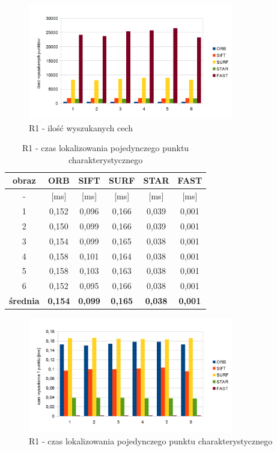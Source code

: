 \begin{figure}[!htbp]
\centering
\includegraphics[width=0.8\textwidth]{pict/slowik/r1/F1.png}
\caption{R1 - ilość wyszukanych cech}
\label{fig:r1_f1}
\end{figure}


\begin{table}[htbp]
  \centering
  \caption{R1 - czas lokalizowania pojedynczego punktu charakterystycznego}
    \begin{tabular}{|c|c|c|c|c|c|}
    \hline
    obraz & \textbf{ORB} & \textbf{SIFT} & \textbf{SURF} & \textbf{STAR} & \textbf{FAST} \\
    \hline
    -  & [ms] & [ms] & [ms] & [ms] & [ms] \\\hline
    1 & 0,152 & 0,096 & 0,166 & 0,039 & 0,001 \\
    2 & 0,150 & 0,099 & 0,166 & 0,039 & 0,001 \\
    3 & 0,154 & 0,099 & 0,165 & 0,038 & 0,001 \\
    4 & 0,158 & 0,101 & 0,164 & 0,038 & 0,001 \\
    5 & 0,158 & 0,103 & 0,163 & 0,038 & 0,001 \\
    6 & 0,152 & 0,095 & 0,166 & 0,038 & 0,001 \\\hline
    \textbf{średnia} & \textbf{0,154} & \textbf{0,099} & \textbf{0,165} & \textbf{0,038} & \textbf{0,001} \\
    \hline
    \end{tabular}%
  \label{tab:r1_f2}%
\end{table}%


\begin{figure}[htbp]
\centering
\includegraphics[width=0.8\textwidth]{pict/slowik/r1/f2.png}
\caption{R1 - czas lokalizowania pojedynczego punktu charakterystycznego}
\label{fig:r1_f2}
\end{figure}

